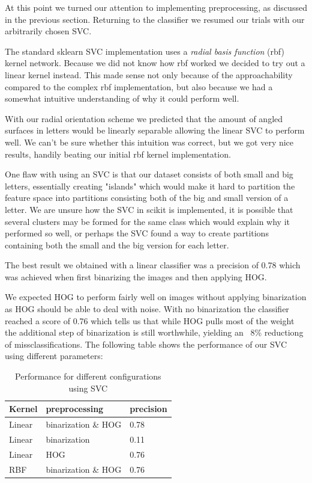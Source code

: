 \documentclass[paper=a4, fontsize=11pt]{scrartcl} %
\numberwithin{equation}{section} %
\numberwithin{figure}{section} %
\numberwithin{table}{section} %
\begin{document}
At this point we turned our attention to implementing preprocessing, as discussed in the previous section.
Returning to the classifier we resumed our trials
with our arbitrarily chosen SVC.

The standard sklearn SVC
implementation uses a \textit{radial basis function} (rbf) kernel network.
Because we did not know how rbf worked we decided to try out
a linear kernel instead.  This made sense not only because of the
approachability compared to the complex rbf implementation, but also
because we had a somewhat intuitive understanding of why it could
perform well.

With our radial orientation scheme we predicted that
the amount of angled surfaces in letters would be linearly separable
allowing the linear SVC to perform well.  We can't be sure whether
this intuition was correct, but we got very nice results, handily
beating our initial rbf kernel implementation.

One flaw with using an
SVC is that our dataset consists of both small and big letters,
essentially creating "islands" which would make it hard to partition
the feature space into partitions consisting both of the big and small
version of a letter.  We are unsure how the SVC in scikit is
implemented, it is possible that several clusters may be formed for
the same class which would explain why it performed so well, or
perhaps the SVC found a way to create partitions containing both the
small and the big version for each letter.

The best result we
obtained with a linear classifier was a precision of 0.78 which was
achieved when first binarizing the images and then applying HOG.

We expected HOG to perform fairly well on images without
applying binarization as HOG should be able to deal with noise.  With
no binarization the classifier reached a score of 0.76 which tells us
that while HOG pulls most of the weight the additional step of
binarization is still worthwhile, yielding an ~8\% reductiong of
missclassifications.  The following table shows the performance of our
SVC using different parameters:

\begin{table}[H]
    \centering
    \begin{tabular}{l | l | l}
        Kernel & preprocessing & precision\\ \hline
        Linear & binarization \& HOG & 0.78 \\ \hline
        Linear & binarization & 0.11 \\ \hline
        Linear & HOG & 0.76\\ \hline
        RBF & binarization \& HOG & 0.76\\
    \end{tabular}
    \caption{Performance for different configurations using SVC}
\end{table}
\end{document}
